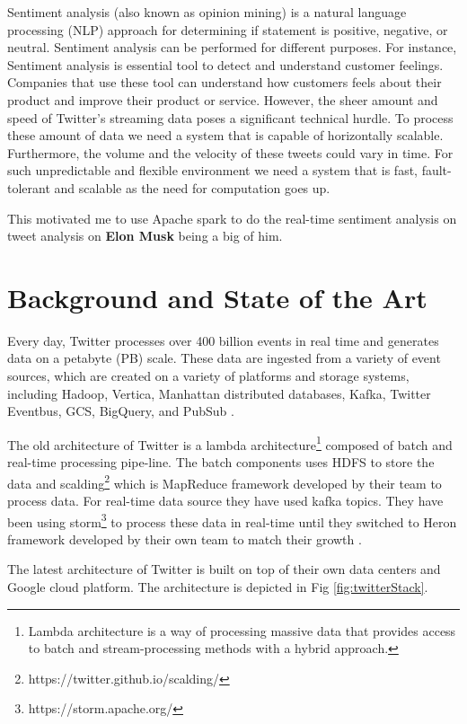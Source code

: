 \documentclass[12pt,a4paper]{report}
\begin{document}
Sentiment analysis (also known as opinion mining) is a natural language processing (NLP) approach for determining if statement is positive, negative, or neutral. Sentiment analysis can be performed for different purposes. For instance, Sentiment analysis is essential tool to detect and understand customer feelings\cite{DBLP:journals/corr/abs-1709-07434}. Companies that use these tool can understand how customers feels about their product and improve their product or service. However, the sheer amount and speed of Twitter's streaming data poses a significant technical hurdle. To process these amount of data we need a system  that is capable of horizontally scalable. Furthermore, the volume and the velocity of these tweets could vary in time. For such unpredictable and flexible environment we need a system that is fast, fault-tolerant and scalable as the need for computation goes up.

This motivated me to use Apache spark to do the real-time sentiment analysis on tweet analysis on \textbf{Elon Musk} being a big of him.

\section{Background and State of the Art}

Every day, Twitter processes over 400 billion events in real time and generates data on a petabyte (PB) scale. These data are ingested from a variety of event sources, which are created on a variety of platforms and storage systems, including Hadoop, Vertica, Manhattan distributed databases, Kafka, Twitter Eventbus, GCS, BigQuery, and PubSub \cite{twitterLatest}.

The old architecture of Twitter is a lambda architecture\footnote{Lambda architecture is a way of processing massive data that provides access to batch and stream-processing methods with a hybrid approach.} composed of batch and real-time processing pipe-line. The batch components uses HDFS to store the data and scalding\footnote{https://twitter.github.io/scalding/}  which is MapReduce framework developed by their team  to process data. For real-time data source they have used kafka topics. They have been using storm\footnote{https://storm.apache.org/} to process these data in real-time until they switched to Heron framework developed by their own team to match their growth \cite{10.1145/2723372.2742788}.

The latest architecture of Twitter is built on top of their own data centers and Google cloud platform. The architecture is depicted in Fig \ref{fig:twitterStack}.
\end{document}
